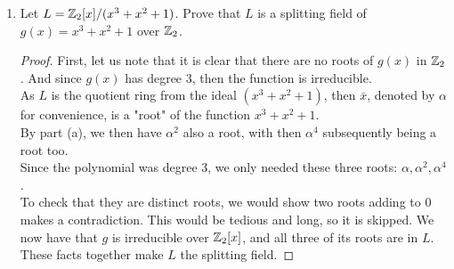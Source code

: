 \documentclass[12pt]{article}
\begin{document}
\begin{enumerate}
\begin{enumerate}
\begin{proof}
				Now to check that $\alpha \neq \alpha^2$. BWOC, assume $\alpha + \alpha^2 = 0 \implies \alpha(\alpha+1)=0$. But $\alpha \neq 0$ nor $\alpha \neq 1$. So $\alpha \neq \alpha^2$.\\ 
				We now have that $f$ is irreducible over $\Z_2[x]$, and all two of its roots are in $E$. These facts together make $E$ the splitting field.
			\end{proof}
			\item Let $L = \mathbb{Z}_2[x]/(x^3 + x^2 + 1)$. Prove that $L$ is a splitting field of $g(x) = x^3 + x^2 + 1$ over $\mathbb{Z}_2$.
			\begin{proof}
				First, let us note that it is clear that there are no roots of $g(x)$ in $\mathbb{Z}_2$. And since $g(x)$ has degree 3, then the function is irreducible.\\
				As $L$ is the quotient ring from the ideal $(x^3+x^2+1)$, then $\bar{x}$, denoted by $\alpha$ for convenience, is a "root" of the function $x^3+x^2+1$.\\
				By part (a), we then have $\alpha^2$ also a root, with then $\alpha^4$ subsequently being a root too.\\
				Since the polynomial was degree 3, we only needed these three roots: $\alpha, \alpha^2, \alpha^4$.\\
				To check that they are distinct roots, we would show two roots adding to 0 makes a contradiction. This would be tedious and long, so it is skipped.
				We now have that $g$ is irreducible over $\Z_2[x]$, and all three of its roots are in $L$. These facts together make $L$ the splitting field.
			\end{proof}
		\end{enumerate}
	

\end{enumerate}
\end{document}
